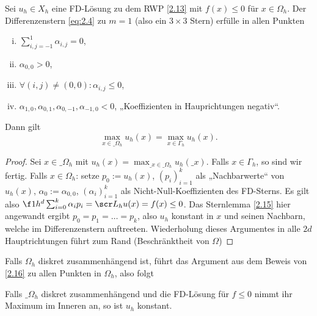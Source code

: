\begin{st} \label{2.16}
	Sei $u_h \in X_h$ eine FD-Lösung zu dem RWP \ref{2.13} mit $f(x) \le 0$ für $x \in \Omega_h$.
	Der Differenzenstern \eqref{eq:2.4} zu $m = 1$ (also ein $3\times 3$ Stern) erfülle in allen Punkten
	\begin{enumerate}[i)]
		\item
			$\sum_{i,j=-1}^1 \alpha_{i,j} = 0$,
		\item
			$\alpha_{0,0} > 0$,
		\item
			$\forall (i,j) \neq (0,0) : \alpha_{i,j} \le 0$,
		\item
			$\alpha_{1,0}, \alpha_{0,1}, \alpha_{0,-1}, \alpha_{-1,0} < 0$, „Koeffizienten in Hauprichtungen negativ“.
	\end{enumerate}
	Dann gilt
	\[
		\max_{x\in\_\Omega_h} u_h(x) = \max_{x\in \Gamma_h} u_h(x).
	\]
	\begin{proof}
		Sei $x \in \_\Omega_h$ mit $u_h(x) = \max_{\_x\in \_\Omega_h} u_h (\_x)$.
		Falls $x \in \Gamma_h$, so sind wir fertig.
		Falls $x \in \Omega_h$: setze $p_0 := u_h(x)$, $(p_i)_{i=1}^k$ als „Nachbarwerte“ von $u_h(x)$, $\alpha_0 := \alpha_{0,0}$, $(\alpha_i)_{i=1}^k$ als Nicht-Null-Koeffizienten des FD-Sterns.
		Es gilt also $\f 1{h^d} \sum_{i=0}^k \alpha_i p_i = \scr L_h u(x) = f(x) \le 0$.
		Das Sternlemma \ref{2.15} hier angewandt ergibt $p_0 = p_1 = \dotsc = p_k$, also $u_h$ konstant in $x$ und seinen Nachbarn, welche im Differenzenstern auftreeten.
		Wiederholung dieses Argumentes in alle $2d$ Hauptrichtungen führt zum Rand (Beschränktheit von $\Omega$)
	\end{proof}
\end{st}

Falls $\Omega_h$ diskret zusammenhängend ist, führt das Argument aus dem Beweis von \ref{2.16} zu allen Punkten in $\Omega_h$, also folgt

\begin{kor} \label{2.17}
	Falls $\_\Omega_h$ diskret zusammenhängend und die FD-Lösung für $f \le 0$ nimmt ihr Maximum im Inneren an, so ist $u_h$ konstant.
\end{kor}

